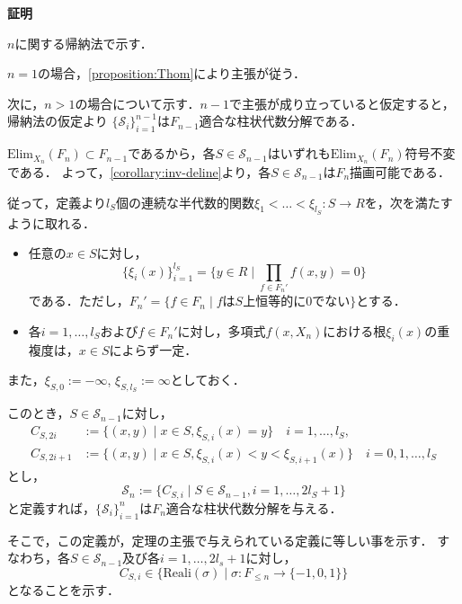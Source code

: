 \documentclass[uplatex, dvipdfmx]{jsarticle}
\makeatletter
\numberwithin{equation}{section}
\renewenvironment{proof}[1][\proofname]{\par
  \pushQED{\qed}%
  \normalfont \topsep6\p@\@plus6\p@\relax
  \trivlist
  \item\relax
  {\bfseries
  #1\@addpunct{.}}\hspace\labelsep\ignorespaces
}{
  \popQED\endtrivlist\@endpefalse
}
\newcommand{\calS}{\mathcal{S}}
\newcommand{\Elim}{\mathrm{Elim}}
\newcommand{\Reali}{\mathrm{Reali}}
\newcommand{\map}[3]{{#1}\colon{#2}\rightarrow{#3}}
\theoremstyle{definition}
\renewcommand{\proofname}{\textbf{証明}}
\makeatother
\begin{document}
\begin{proof}
     $n$に関する帰納法で示す．

     $n=1$の場合，\cref{proposition:Thom}により主張が従う．

     次に，$n>1$の場合について示す．$n-1$で主張が成り立っていると仮定すると，帰納法の仮定より
     $\{\calS_{i}\}_{i=1}^{n-1}$は$F_{n-1}$適合な柱状代数分解である．

     $\Elim_{X_n}(F_n) \subset F_{n-1}$であるから，各$S \in \calS_{n-1}$はいずれも$\Elim_{X_n}(F_n)$符号不変である．
     よって，\cref{corollary:inv-deline}より，各$S \in \calS_{n-1}$は$F_n$描画可能である．

     従って，定義より$l_S$個の連続な半代数的関数$\map{\xi_1<\dots<\xi_{l_S}}{S}{R}$を，次を満たすように取れる．
     \begin{itemize}
          \item 任意の$ x \in S $に対し，
          \begin{equation}
               \{\xi_i(x)\}_{i=1}^{l_S} = \{y \in R \mid \prod_{f \in F_n'}f(x,y)=0\}
          \end{equation}
          である．ただし，$F_n' = \{f \in F_n \mid \text{$f$は$S$上恒等的に$0$でない}\}$とする．
          \item 各$i=1, \dots, l_S$および$f \in F_n'$に対し，多項式$f(x,X_n)$における根$\xi_i(x)$の重複度は，$x\in S$によらず一定．
     \end{itemize}
     また，$\xi_{S,0} := -\infty$, $\xi_{S,l_S} := \infty$としておく．

     このとき，$S \in \calS_{n-1}$に対し，
     \begin{align}
          C_{S,2i} &:= \{(x,y) \mid  x \in S, \xi_{S,i}(x) = y \} \quad i = 1,\dots, l_S,\\
          C_{S,2i+1} &:= \{(x,y) \mid x \in S, \xi_{S,i}(x)<y<\xi_{S,i+1}(x) \} \quad i = 0,1, \dots, l_S 
     \end{align}
     とし，
     \begin{equation}
          \calS_n := \{C_{S,i} \mid S \in \calS_{n-1}, i=1, \dots, 2l_S+1 \}
     \end{equation}
     と定義すれば，$\{\calS_i\}_{i=1}^n$は$F_n$適合な柱状代数分解を与える．

     そこで，この定義が，定理の主張で与えられている定義に等しい事を示す．
     すなわち，各$S \in \calS_{n-1}$及び各$i=1, \dots, 2l_s+1$に対し，
     \begin{equation}
          C_{S,i} \in \{\Reali(\sigma) \mid \map{\sigma}{F_{\leq n}}{\{-1,0,1\}}\}
     \end{equation}
     となることを示す．

\end{proof}
\end{document}
